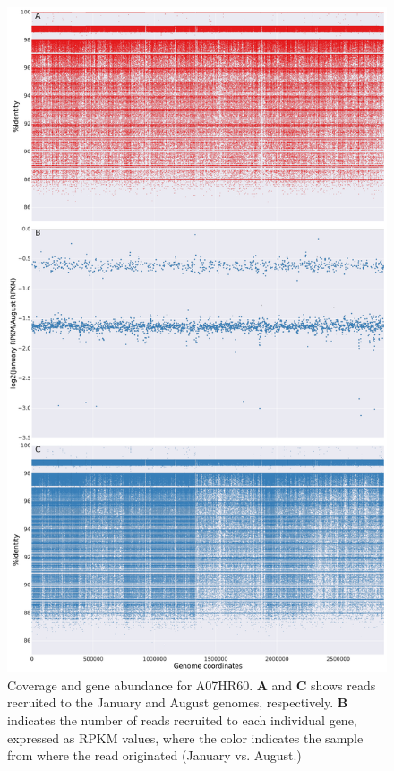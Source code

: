 \begin{figure}[!hbtp]
  \centering
  \includegraphics[width=\textwidth,height=0.8\textheight,keepaspectratio]{Chapter5/Figures/coverage_plots/A07HR60_coverage.pdf}
  \caption{Coverage and gene abundance for A07HR60. \textbf{A} and \textbf{C} shows reads recruited to the January and August genomes, respectively. \textbf{B} indicates the number of reads recruited to each individual gene, expressed as RPKM values, where the color indicates the sample from where the read originated (January vs. August.)}
  \label{A07HR60coverage}
\end{figure}

